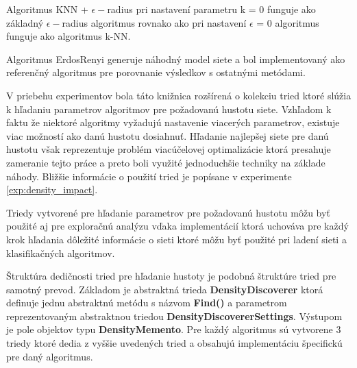 \documentclass[slovak,master,dept460,male,cpp,cpdeclaration]{diploma}
\begin{document}
Algoritmus KNN + $\epsilon-$radius pri nastavení parametru k = 0  funguje ako základný $\epsilon-$radius algoritmus rovnako ako pri nastavení $\epsilon$ = 0 algoritmus funguje ako algoritmus k-NN.

Algoritmus ErdosRenyi generuje náhodný model siete \cite{erdos59a} a bol implementovaný ako referenčný algoritmus pre porovnanie výsledkov s ostatnými metódami. 

V priebehu experimentov bola táto knižnica rozšírená o kolekciu tried ktoré slúžia k hľadaniu parametrov algoritmov pre požadovanú hustotu siete. Vzhľadom k faktu že niektoré algoritmy vyžadujú nastavenie viacerých parametrov, existuje viac možností ako danú hustotu dosiahnuť. Hľadanie najlepšej siete pre danú hustotu však reprezentuje problém viacúčelovej optimalizácie ktorá presahuje zameranie tejto práce a preto boli využité jednoduchšie techniky na základe náhody. Bližšie informácie o použití tried je popísane v experimente \ref{exp:density_impact}.

Triedy vytvorené pre hľadanie parametrov pre požadovanú hustotu môžu byť použité aj pre exploračnú  analýzu vďaka implementácií ktorá uchováva pre každý krok hľadania dôležité informácie o sieti ktoré môžu byť použité pri ladení sieti a klasifikačných algoritmov.

Štruktúra dedičnosti tried pre hľadanie hustoty je podobná štruktúre tried pre samotný prevod. Základom je abstraktná trieda \textbf{DensityDiscoverer} ktorá definuje jednu abstraktnú metódu s názvom \textbf{Find()} a parametrom reprezentovaným abstraktnou triedou \textbf{DensityDiscovererSettings}. Výstupom je pole objektov typu \textbf{DensityMemento}. Pre každý algoritmus sú vytvorene 3 triedy ktoré dedia z vyššie uvedených tried a obsahujú implementáciu špecifickú pre daný algoritmus.
\end{document}
